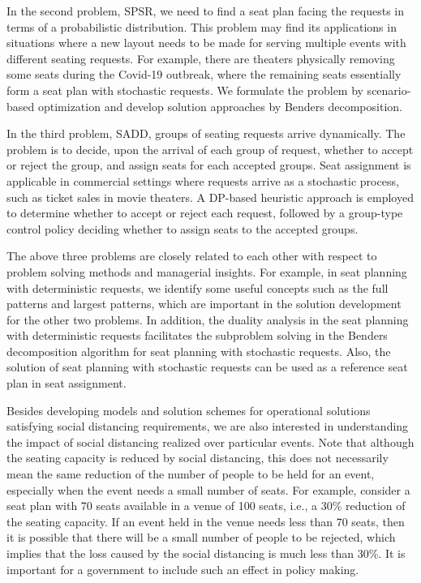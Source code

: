 In the second problem, SPSR, we need to find a seat plan facing the requests in terms of a probabilistic distribution. This problem may find its applications in situations where a new layout needs to be made for serving multiple events with different seating requests. For example, there are theaters \cite{Berlin_theater} physically removing some seats during the Covid-19 outbreak, where the remaining seats essentially form a seat plan with stochastic requests. We formulate the problem by scenario-based optimization and develop solution approaches by Benders decomposition.

In the third problem, SADD, groups of seating requests arrive dynamically. The problem is to decide, upon the arrival of each group of request, whether to accept or reject the group, and assign seats for each accepted groups. Seat assignment is applicable in commercial settings where requests arrive as a stochastic process, such as ticket sales in movie theaters. A DP-based heuristic approach is employed to determine whether to accept or reject each request, followed by a group-type control policy deciding whether to assign seats to the accepted groups.


The above three problems are closely related to each other with respect to problem solving methods and managerial insights. For example, in seat planning with deterministic requests, we identify some useful concepts such as the full patterns and largest patterns, which are important in the solution development for the other two problems. In addition, the duality analysis in the seat planning with deterministic requests facilitates the subproblem solving in the Benders decomposition algorithm for seat planning with stochastic requests. Also, the solution of seat planning with stochastic requests can be used as a reference seat plan in seat assignment.


Besides developing models and solution schemes for operational solutions satisfying  social distancing requirements, we are also interested in understanding the impact of social  distancing realized over  particular events. Note that although the seating capacity  is reduced by social distancing, this does not necessarily mean the same reduction of the number of people to be held for an event, especially when the event  needs a small number of seats. For example, consider a seat plan with 70 seats available in a venue of 100 seats, i.e., a 30\% reduction of the seating capacity. If an event held in the venue needs less than 70 seats, then it is possible that there will be a small number of people to be rejected, which implies that the loss caused by the social distancing is much less than 30\%. It is important for a government to include such an effect in policy making.


